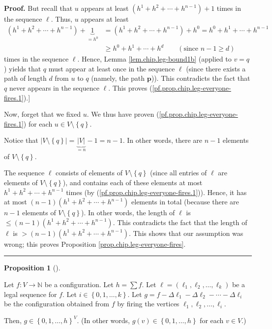 \documentclass[numbers=enddot,12pt,final,onecolumn,notitlepage]{scrartcl}%
\theoremstyle{definition}
\newtheorem{prop}[theo]{Proposition}
\newenvironment{proposition}[1][]
{\begin{prop}[#1]\begin{leftbar}}
{\end{leftbar}\end{prop}}
\newenvironment{proof}[1][Proof]{\noindent\textbf{#1.} }{\ \rule{0.5em}{0.5em}}
\let\sumnonlimits\sum
\renewcommand{\sum}{\sumnonlimits\limits}
\newcommand{\NN}{\mathbb{N}}
\newcommand{\set}[1]{\left\{ #1 \right\}}
\newcommand{\tup}[1]{\left( #1 \right)}
\begin{document}
\begin{proof}
But recall that $u$ appears at least $\left(  h^{1}+h^{2}+\cdots
+h^{n-1}\right)  +1$ times in the sequence $\ell$. Thus, $u$ appears at least%
\begin{align*}
\left(  h^{1}+h^{2}+\cdots+h^{n-1}\right)  +\underbrace{1}_{=h^{0}}  &
=\left(  h^{1}+h^{2}+\cdots+h^{n-1}\right)  +h^{0}=h^{0}+h^{1}+\cdots
+h^{n-1}\\
& \geq h^{0}+h^{1}+\cdots+h^{d}
\qquad \left( \text{since } n-1 \geq d \right)
\end{align*}
times in the sequence $\ell$. Hence, Lemma \ref{lem.chip.leg-bound1b} (applied
to $v=q$) yields that $q$ must appear at least once in the sequence $\ell$
(since there exists a path of length $d$ from $u$ to $q$ (namely, the path
$\mathbf{p}$)). This contradicts the fact that $q$ never appears in the
sequence $\ell$. This proves (\ref{pf.prop.chip.leg-everyone-fires.1}).]

Now, forget that we fixed $u$. We thus have proven
(\ref{pf.prop.chip.leg-everyone-fires.1}) for each $u\in V\setminus\left\{
q\right\}  $.

Notice that $\left\vert V\setminus\left\{  q\right\}  \right\vert
=\underbrace{\left\vert V\right\vert }_{=n}-1=n-1$. In other words, there are
$n-1$ elements of $V\setminus\left\{  q\right\}  $.

The sequence $\ell$ consists of elements of $V\setminus\left\{  q\right\}  $
(since all entries of $\ell$ are elements of $V\setminus\left\{  q\right\}
$), and contains each of these elements at most $h^{1}+h^{2}+\cdots+h^{n-1}$
times (by (\ref{pf.prop.chip.leg-everyone-fires.1})). Hence, it has at most
$\left(  n-1\right)  \left(  h^{1}+h^{2}+\cdots+h^{n-1}\right)  $ elements in
total (because there are $n-1$ elements of $V\setminus\left\{  q\right\}  $).
In other words, the length of $\ell$ is $\leq\left(  n-1\right)  \left(
h^{1}+h^{2}+\cdots+h^{n-1}\right)  $. This contradicts the fact that the
length of $\ell$ is $>\left(  n-1\right)  \left(  h^{1}+h^{2}+\cdots
+h^{n-1}\right)  $. This shows that our assumption was wrong; this proves
Proposition \ref{prop.chip.leg-everyone-fires}.
\end{proof}

\begin{proposition} \label{prop.chip.leg-period-a}
Let $f : V \to \NN$ be a configuration.
Let $h = \sum f$.
Let $\ell = \tup{\ell_1, \ell_2, \ldots, \ell_k}$ be a
legal sequence for $f$.
Let $i \in \set{0, 1, \ldots, k}$.
Let
$g = f - \Delta \ell_1 - \Delta \ell_2 - \cdots - \Delta \ell_i$
be the configuration obtained from $f$ by firing the vertices
$\ell_1, \ell_2, \ldots, \ell_i$.

Then, $g \in \set{0, 1, \ldots, h}^V$.
(In other words, $g \tup{v} \in \set{0, 1, \ldots, h}$
for each $v \in V$.)
\end{proposition}
\end{document}
